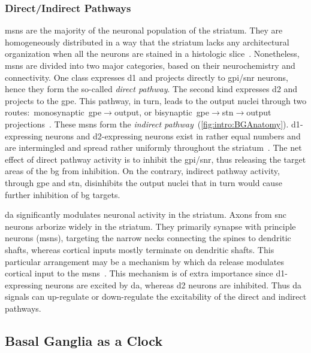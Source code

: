 \subsubsection{Direct/Indirect Pathways}
\label{intro:bg:pathways}
\Glspl{msn} are the majority of the neuronal population of the striatum.
They are homogeneously distributed in a way that the striatum lacks any architectural organization when all the neurons are stained in a histologic slice~\cite{Dudman2015Book}.
Nonetheless, \glspl{msn} are divided into two major categories, based on their neurochemistry and connectivity.
One class expresses \gls{d1} and projects directly to \gls{gpi}/\gls{snr} neurons, hence they form the so-called \emph{direct pathway}.
The second kind expresses \gls{d2} and projects to the \gls{gpe}.
This pathway, in turn, leads to the output nuclei through two routes:~monosynaptic~\gls{gpe}$\rightarrow$output, or bisynaptic~\gls{gpe}$\rightarrow$\gls{stn}$\rightarrow$output projections~\cite{TURNER2000BasalFunction}.
These \glspl{msn} form the \emph{indirect pathway}~(\autoref{fig:intro:BGAnatomy}).
\Gls{d1}-expressing neurons and \gls{d2}-expressing neurons exist in rather equal numbers and are intermingled and spread rather uniformly throughout the striatum~\cite{Dudman2015Book}.
The net effect of direct pathway activity is to inhibit the \gls{gpi}/\gls{snr}, thus releasing the target areas of the \gls{bg} from inhibition.
On the contrary, indirect pathway activity, through \gls{gpe} and \gls{stn}, disinhibits the output nuclei that in turn would cause further inhibition of \gls{bg} targets.
\par
\Gls{da} significantly modulates neuronal activity in the striatum.
Axons from \gls{snc} neurons arborize widely in the striatum.
They primarily synapse with principle neurons (\glspl{msn}), targeting the narrow necks connecting the spines to dendritic shafts, whereas cortical inputs mostly terminate on dendritic shafts.
This particular arrangement may be a mechanism by which \gls{da} release modulates cortical input to the \glspl{msn}~\cite{TURNER2000BasalFunction}.
This mechanism is of extra importance since \gls{d1}-expressing neurons are excited by \gls{da}, whereas \gls{d2} neurons are inhibited.
Thus \gls{da} signals can up-regulate or down-regulate the excitability of the direct and indirect pathways.



\subsection{Basal Ganglia as a Clock}
\label{ch:intro:BGTime}

